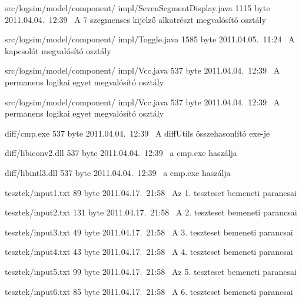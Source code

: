 \begin{fajllista}
\fajl
{src/logsim/model/component/\newline
impl/SevenSegmentDisplay.java} %
{1115 byte} %
{2011.04.04.~12:39~} %
{A 7 szegmenses kijelző alkatrészt megvalósító osztály} %

\fajl
{src/logsim/model/component/\newline
impl/Toggle.java} %
{1585 byte} %
{2011.04.05.~11:24~} %
{A kapcsolót megvalósító osztály} %

\fajl
{src/logsim/model/component/\newline
impl/Vcc.java} %
{537 byte} %
{2011.04.04.~12:39~} %
{A permanens logikai egyet megvalósító osztály} %

\fajl
{src/logsim/model/component/\newline
impl/Vcc.java} %
{537 byte} %
{2011.04.04.~12:39~} %
{A permanens logikai egyet megvalósító osztály} %

\fajl
{diff/cmp.exe} %
{537 byte} %
{2011.04.04.~12:39~} %
{A diffUtils összehasonlító exe-je} %

\fajl
{diff/libiconv2.dll} %
{537 byte} %
{2011.04.04.~12:39~} %
{a cmp.exe haszálja} %

\fajl
{diff/libintl3.dll} %
{537 byte} %
{2011.04.04.~12:39~} %
{a cmp.exe haszálja} %

\fajl
{tesztek/input1.txt} %
{89 byte} %
{2011.04.17.~21:58~} %
{Az 1. teszteset bemeneti parancsai} %

\fajl
{tesztek/input2.txt} %
{131 byte} %
{2011.04.17.~21:58~} %
{A 2. teszteset bemeneti parancsai} %

\fajl
{tesztek/input3.txt} %
{49 byte} %
{2011.04.17.~21:58~} %
{A 3. teszteset bemeneti parancsai} %

\fajl
{tesztek/input4.txt} %
{43 byte} %
{2011.04.17.~21:58~} %
{A 4. teszteset bemeneti parancsai} %

\fajl
{tesztek/input5.txt} %
{99 byte} %
{2011.04.17.~21:58~} %
{Az 5. teszteset bemeneti parancsai} %

\fajl
{tesztek/input6.txt} %
{85 byte} %
{2011.04.17.~21:58~} %
{A 6. teszteset bemeneti parancsai} %


\end{fajllista}

